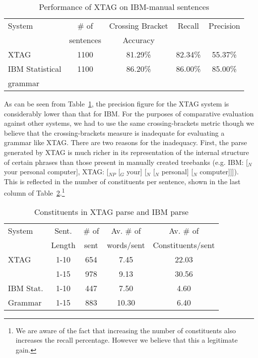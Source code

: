 \begin{table}[ht]
\centering
\begin{tabular}{|l|c|c|c|c|} \hline 
System & \# of & Crossing Bracket & Recall & Precision \\
& sentences & Accuracy & & \\ \hline
XTAG & 1100 & 81.29\% & 82.34\% & 55.37\% \\ \hline
IBM Statistical & 1100 & 86.20\% & 86.00\% & 85.00\% \\
grammar & &  &  &\\ \hline
\end{tabular}

\vspace{0.1in}

\caption{Performance of XTAG on IBM-manual sentences}
\label{ibm-results} 

\end{table}

As can be seen from Table~\ref{ibm-results}, the precision figure for
the XTAG system is considerably lower than that for IBM. For the
purposes of comparative evaluation against other systems, we had to
use the same crossing-brackets metric though we believe that the
crossing-brackets measure is inadequate for evaluating a grammar like
XTAG. There are two reasons for the inadequacy. First, the parse
generated by XTAG is much richer in its representation of the internal
structure of certain phrases than those present in manually created
treebanks (e.g. IBM: [$_N$ your personal computer], XTAG: [$_{NP}$
[$_G$ your] [$_N$ [$_N$ personal] [$_N$ computer]]]). This is
reflected in the number of constituents per sentence, shown in the
last column of Table~\ref{const-no}.\footnote{We are aware of the fact
  that increasing the number of constituents also increases the recall
  percentage. However we believe that this a legitimate gain.}

\begin{table}[ht]
\centering
\begin{tabular}{|l|c|c|c|c|} \hline
System & Sent. & \# of & Av. \# of & Av. \# of \\
& Length & sent & words/sent & Constituents/sent \\ \hline
XTAG & 1-10 & 654 & 7.45 & 22.03  \\ \cline{2-5}
& 1-15 & 978 & 9.13 & 30.56 \\ \hline
IBM Stat. & 1-10 & 447 & 7.50 & 4.60 \\ \cline{2-5}
Grammar & 1-15 & 883 & 10.30 & 6.40 \\ \hline
\end{tabular}
\caption{Constituents in XTAG parse and IBM parse}
\label{const-no}
\end{table}

